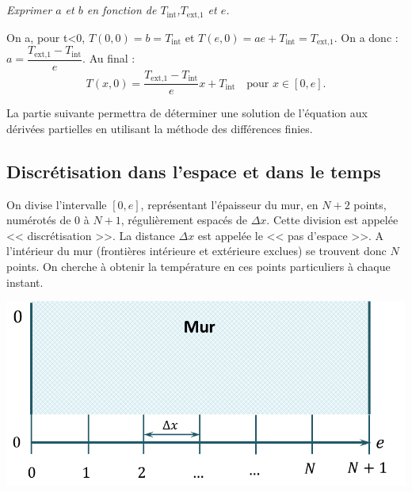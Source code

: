 \documentclass[10pt,fleqn]{article} %
\begin{document}
\begin{multicols}{2}
\begin{corrige}
\end{corrige}

\else
\fi

\subparagraph{\label{q_tini}}\textit{Exprimer $a$ et $b$ en fonction de $T_{\text{int}}$,$T_{\text{ext,1}}$ et $e$.}
\ifprof
\begin{corrige}
On a, pour t<0, $T(0,0)= b = T_{\text{int}}$ et  $T(e,0)= ae+ T_{\text{int}}= T_{\text{ext,1}}$. On a donc : $a= \dfrac{T_{\text{ext,1}}- T_{\text{int}}}{e}$. Au final :
$$T(x,0)=\dfrac{T_{\text{ext,1}}- T_{\text{int}}}{e} x + T_{\text{int}} \quad \text{pour } x\in[0,e].$$
\end{corrige}
\else
\fi
\ifprof
\else
\vspace{.5cm}

La partie suivante permettra de déterminer une solution de l'équation aux dérivées partielles en utilisant la méthode des différences finies.

\fi
\subsection*{Discrétisation dans l'espace et dans le temps}
\ifprof
\else


On divise l'intervalle $[0,e]$, représentant l'épaisseur du mur, en $N+2$ points, numérotés de 0 à $N+1$, régulièrement espacés de $\Delta x$. Cette division est appelée << discrétisation >>. La distance $\Delta x$ est appelée le << pas d’espace >>. A l'intérieur du mur (frontières intérieure et extérieure exclues) se trouvent donc $N$ points. On cherche à obtenir la température en ces points particuliers à chaque instant. 



\begin{center}
\includegraphics[width=\linewidth]{images/figure_02}
\end{center}

\fi


\end{multicols}
\end{document}
